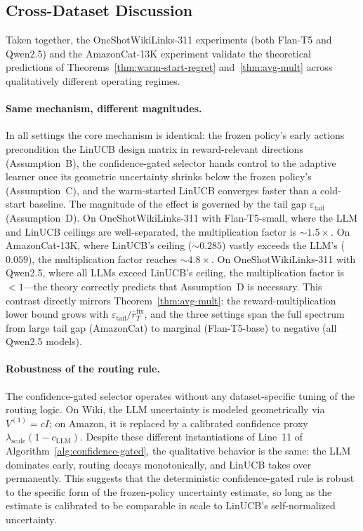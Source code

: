 \clearpage
\subsection{Cross-Dataset Discussion}
\label{sec:cross_dataset}

Taken together, the OneShotWikiLinks-311 experiments (both Flan-T5 and Qwen2.5) and the AmazonCat-13K experiment validate the theoretical predictions of Theorems~\ref{thm:warm-start-regret} and~\ref{thm:avg-mult} across qualitatively different operating regimes.

\paragraph{Same mechanism, different magnitudes.}
In all settings the core mechanism is identical: the frozen policy's early actions precondition the LinUCB design matrix in reward-relevant directions (Assumption~B), the confidence-gated selector hands control to the adaptive learner once its geometric uncertainty shrinks below the frozen policy's (Assumption~C), and the warm-started LinUCB converges faster than a cold-start baseline. The magnitude of the effect is governed by the tail gap $\varepsilon_{\mathrm{tail}}$ (Assumption~D). On OneShotWikiLinks-311 with Flan-T5-small, where the LLM and LinUCB ceilings are well-separated, the multiplication factor is ${\sim}1.5\times$. On AmazonCat-13K, where LinUCB's ceiling (${\sim}0.285$) vastly exceeds the LLM's ($0.059$), the multiplication factor reaches ${\sim}4.8\times$. On OneShotWikiLinks-311 with Qwen2.5, where all LLMs exceed LinUCB's ceiling, the multiplication factor is $<1$---the theory correctly predicts that Assumption~D is necessary. This contrast directly mirrors Theorem~\ref{thm:avg-mult}: the reward-multiplication lower bound grows with $\varepsilon_{\mathrm{tail}} / \bar{r}_T^{\mathrm{fix}}$, and the three settings span the full spectrum from large tail gap (AmazonCat) to marginal (Flan-T5-base) to negative (all Qwen2.5 models).

\paragraph{Robustness of the routing rule.}
The confidence-gated selector operates without any dataset-specific tuning of the routing logic. On Wiki, the LLM uncertainty is modeled geometrically via $V^{(1)} = cI$; on Amazon, it is replaced by a calibrated confidence proxy $\lambda_{\mathrm{scale}}(1 - c_{\mathrm{LLM}})$. Despite these different instantiations of Line~11 of Algorithm~\ref{alg:confidence-gated}, the qualitative behavior is the same: the LLM dominates early, routing decays monotonically, and LinUCB takes over permanently. This suggests that the deterministic confidence-gated rule is robust to the specific form of the frozen-policy uncertainty estimate, so long as the estimate is calibrated to be comparable in scale to LinUCB's self-normalized uncertainty.

